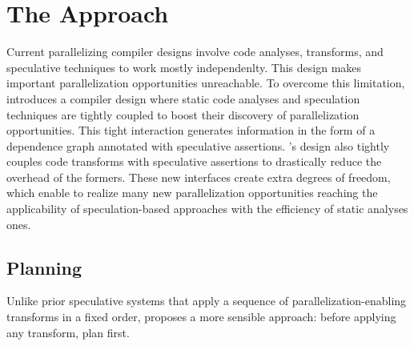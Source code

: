 \section{The \name Approach}
\label{sec:approach}

Current parallelizing compiler designs involve code analyses, transforms, and speculative techniques to work mostly independenlty.
This design makes important parallelization opportunities unreachable.
To overcome this limitation, \name introduces a compiler design where static code analyses and speculation techniques are tightly coupled to boost their discovery of parallelization opportunities.
This tight interaction generates information in the form of a dependence graph annotated with speculative assertions.
\namensp's design also tightly couples code transforms with speculative assertions to drastically reduce the overhead of the formers.
These new interfaces create extra degrees of freedom, which enable \name to realize many new parallelization opportunities reaching the applicability of speculation-based approaches with the efficiency of static analyses ones.


\subsection{Planning}
\label{planning}
%
Unlike prior speculative systems that apply a sequence of
parallelization-enabling transforms in a fixed order, \name proposes a
more sensible approach: before applying any transform, plan
first.

